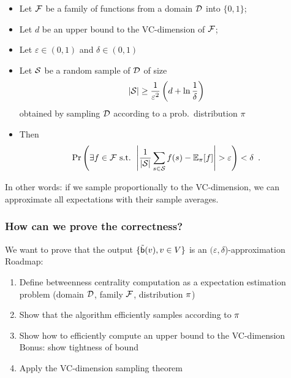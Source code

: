 \begin{frame}
  \begin{theorem}
    \begin{itemize}
      \item Let ${\cal F}$ be a family of functions from a domain ${\cal D}$ into
        $\{0,1\}$;
      \pause
      \item Let $d$ be an upper bound to the VC-dimension of ${\cal F}$;
      \pause
      \item Let $\varepsilon\in(0,1)$ and $\delta\in(0,1)$
      \pause
      \item Let ${\cal S}$ be a random sample of ${\cal D}$ of size
        \[
          |{\cal S}|\ge\frac{1}{\varepsilon^2}\left(d+\ln\frac{1}{\delta}\right)
        \]
        obtained by sampling ${\cal D}$ according to a prob.~distribution
        $\pi$
      \pause
      \item Then
        \[
          \Pr\left(\exists f\in\family \text{ s.t. }
          \left|\frac{1}{|\Sam|}\sum_{s\in\Sam}f(s)-\mathbb{E}_\pi[f]\right|>\varepsilon\right)<\delta\enspace.
        \]
    \end{itemize}
  \end{theorem}
  In other words: if we sample proportionally to the VC-dimension, we can
  approximate all expectations with their sample averages.
\end{frame}

\begin{frame}
  \frametitle{How can we prove the correctness?}
  We want to prove that the output $\{\tilde{\mathsf{b}}(v), v\in V\}$ is an
  $(\varepsilon,\delta$)-approximation
  \vfill
  Roadmap:
  \begin{enumerate}
    \item  Define betweenness centrality computation as a expectation
      estimation problem (domain ${\cal D}$, family ${\cal F}$, distribution
      $\pi$)
    \item Show that the algorithm efficiently samples according to $\pi$
    \item Show how to efficiently compute an upper bound to the VC-dimension\\
      \quad Bonus: show tightness of bound
    \item Apply the VC-dimension sampling theorem
  \end{enumerate}
\end{frame}

